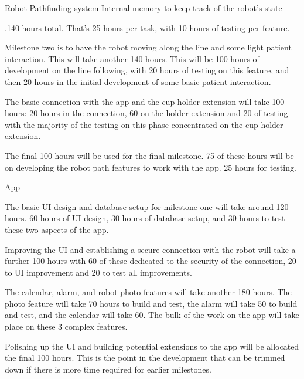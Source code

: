 \documentclass{article}
\begin{document}
Robot Pathfinding system
    Internal memory to keep track of the robot's state 
    
    

.140 hours total. That's 25 hours per task, with 10 hours of testing per feature.

Milestone two is to have the robot moving along the line and some light patient interaction. This will take another 140 hours. This will be 100 hours of development on the line following, with 20 hours of testing on this feature, and then 20 hours in the initial development of some basic patient interaction.

The basic connection with the app and the cup holder extension will take 100 hours: 20 hours in the connection, 60 on the holder extension and 20 of testing with the majority of the testing on this phase concentrated on the cup holder extension.

The final 100 hours will be used for the final milestone. 75 of these hours will be on developing the robot path features to work with the app. 25 hours for testing.


\underline{App}

The basic UI design and database setup for milestone one will take around 120 hours. 60 hours of UI design, 30 hours of database setup, and 30 hours to test these two aspects of the app.

Improving the UI and establishing a secure connection with the robot will take a further 100 hours with 60 of these dedicated to the security of the connection, 20 to UI improvement and 20 to test all improvements.

The calendar, alarm, and robot photo features will take another 180 hours. The photo feature will take 70 hours to build and test, the alarm will take 50 to build and test, and the calendar will take 60. The bulk of the work on the app will take place on these 3 complex features.

Polishing up the UI and building potential extensions to the app will be allocated the final 100 hours. This is the point in the development that can be trimmed down if there is more time required for earlier milestones.
\end{document}
